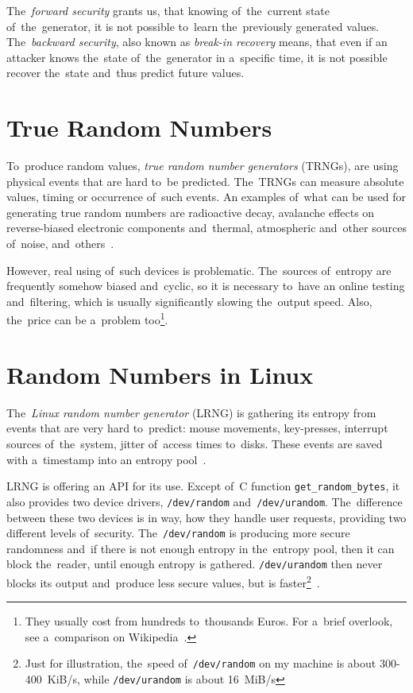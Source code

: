 \par{
The~{\em forward security} grants us, that knowing of~the~current state 
of~the~generator, it is not possible to~learn the~previously generated values. 
The~{\em backward security}, also known as {\em break-in recovery}  means, 
that even if an attacker knows the~state of~the~generator in a~specific time, 
it is not possible recover the~state and~thus predict future values.
}
\section{True Random Numbers}
\par{
To~produce random values, {\em true random number generators} (TRNGs), 
are using physical events that are hard to~be predicted. The~TRNGs 
can measure absolute values, timing or occurrence of~such events.
An examples of~what can be used for generating true random numbers 
are radioactive decay, avalanche effects on reverse-biased electronic 
components and~thermal, atmospheric and~other sources of~noise, 
and~others~\cite[p.~6]{AnalysisOfEntropyLevels}.
}

\par{
However, real using of~such devices is problematic. The~sources of~entropy are 
frequently somehow biased and~cyclic, so it is necessary to~have an online 
testing and~filtering, which is usually significantly slowing the~output speed. 
Also, the~price can be a~problem too\footnote{They usually cost from hundreds 
to~thousands Euros. For a~brief overlook, see a~comparison 
on Wikipedia~\cite{HWRNGComparison}.}.
}

\section{Random Numbers in Linux}\label{sec:randomNumbers:linux}
\par{
The~{\em Linux random number generator} (LRNG) is gathering its entropy 
from events that are very hard to~predict: mouse movements, key-presses, 
interrupt sources of~the~system, jitter of~access times to~disks. 
These events are saved with a~timestamp into an entropy 
pool~\cite{AnalysisOfLinuxRNG}.
}

\par{
LRNG is offering an API for its use. Except of~C function 
{\tt get\_random\_bytes}, it also provides two device drivers, {\tt /dev/random} 
and~{\tt /dev/urandom}. The~difference between these two devices is in way, 
how they handle user requests, providing two different levels of~security. 
The~{\tt /dev/random} is producing more secure randomness and~if there 
is not enough entropy in the~entropy pool, then it can block the~reader, 
until enough entropy is gathered. {\tt /dev/urandom} then never blocks its output
 and~produce less secure values, but is faster\footnote{Just for illustration, 
 the~speed of~{\tt /dev/random} on my machine is about 300-400~KiB/s, 
 while {\tt /dev/urandom} is about 16~MiB/s}~\cite[chapter~1]{AnalysisOfLinuxRNG}. 
}


